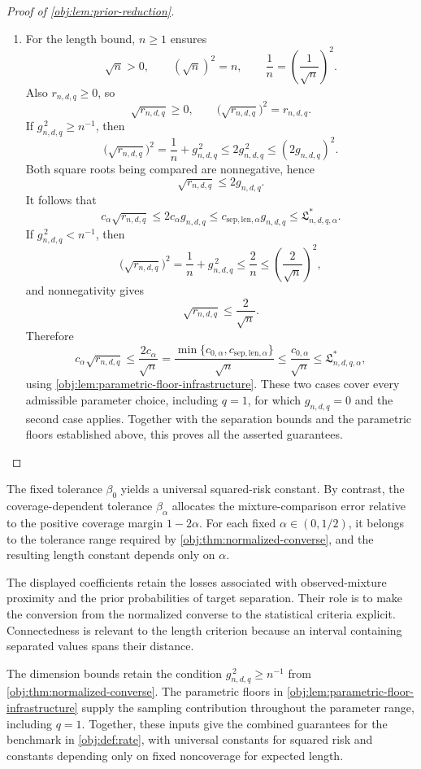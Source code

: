 \documentclass[11pt]{article}
\begin{document}
\begin{proof}[Proof of \cref{obj:lem:prior-reduction}]
\begin{enumerate}
\item For the length bound, \(n\ge1\) ensures
\[
\sqrt n>0,
\qquad
(\sqrt n)^2=n,
\qquad
\frac1n=\left(\frac1{\sqrt n}\right)^2.
\]
Also \(r_{n,d,q}\ge0\), so
\[
\sqrt{r_{n,d,q}}\ge0,
\qquad
\bigl(\sqrt{r_{n,d,q}}\bigr)^2=r_{n,d,q}.
\]
If \(g_{n,d,q}^{\,2}\ge n^{-1}\), then
\[
\bigl(\sqrt{r_{n,d,q}}\bigr)^2
=\frac1n+g_{n,d,q}^{\,2}
\le2g_{n,d,q}^{\,2}
\le(2g_{n,d,q})^2.
\]
Both square roots being compared are nonnegative, hence
\[
\sqrt{r_{n,d,q}}\le2g_{n,d,q}.
\]
It follows that
\[
c_\alpha\sqrt{r_{n,d,q}}
\le2c_\alpha g_{n,d,q}
\le c_{\mathrm{sep,len},\alpha}g_{n,d,q}
\le\mathfrak L^*_{n,d,q,\alpha}.
\]
If \(g_{n,d,q}^{\,2}<n^{-1}\), then
\[
\bigl(\sqrt{r_{n,d,q}}\bigr)^2
=\frac1n+g_{n,d,q}^{\,2}
\le\frac2n
\le\left(\frac2{\sqrt n}\right)^2,
\]
and nonnegativity gives
\[
\sqrt{r_{n,d,q}}\le\frac2{\sqrt n}.
\]
Therefore
\[
c_\alpha\sqrt{r_{n,d,q}}
\le\frac{2c_\alpha}{\sqrt n}
=\frac{\min\{c_{0,\alpha},c_{\mathrm{sep,len},\alpha}\}}{\sqrt n}
\le\frac{c_{0,\alpha}}{\sqrt n}
\le\mathfrak L^*_{n,d,q,\alpha},
\]
using \cref{obj:lem:parametric-floor-infrastructure}.
These two cases cover every admissible parameter choice, including
\(q=1\), for which \(g_{n,d,q}=0\) and the second case applies.
Together with the separation bounds and the parametric floors established
above, this proves all the asserted guarantees.
\end{enumerate}
\end{proof}

The fixed tolerance \(\beta_0\) yields a universal squared-risk constant. By contrast, the coverage-dependent tolerance \(\beta_\alpha\) allocates the mixture-comparison error relative to the positive coverage margin \(1-2\alpha\). For each fixed \(\alpha\in(0,1/2)\), it belongs to the tolerance range required by \cref{obj:thm:normalized-converse}, and the resulting length constant depends only on \(\alpha\).

The displayed coefficients retain the losses associated with observed-mixture proximity and the prior probabilities of target separation. Their role is to make the conversion from the normalized converse to the statistical criteria explicit. Connectedness is relevant to the length criterion because an interval containing separated values spans their distance.

The dimension bounds retain the condition \(g_{n,d,q}^{\,2}\ge n^{-1}\) from \cref{obj:thm:normalized-converse}. The parametric floors in \cref{obj:lem:parametric-floor-infrastructure} supply the sampling contribution throughout the parameter range, including \(q=1\). Together, these inputs give the combined guarantees for the benchmark in \cref{obj:def:rate}, with universal constants for squared risk and constants depending only on fixed noncoverage for expected length.
\end{document}
